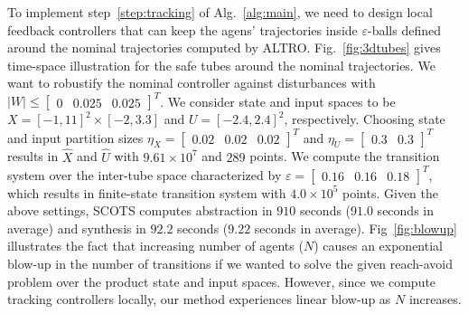  To implement step~\ref{step:tracking} of Alg.~\ref{alg:main}, we need to design local feedback controllers that can keep the agens' trajectories inside $\varepsilon$-balls defined around the nominal trajectories computed by ALTRO. Fig.~\ref{fig:3dtubes} gives time-space illustration for the safe tubes around the nominal trajectories. We want to robustify the nominal controller against disturbances with $|W|\leq \begin{bmatrix}0&0.025&0.025\end{bmatrix}^T$. We consider state and input spaces to be $X=[-1,11]^2\times[-2,3.3]$ and
$U=[-2.4,2.4]^2$, respectively. Choosing state and input partition sizes $\eta_{X}=\begin{bmatrix}0.02&0.02&0.02\end{bmatrix}^T$ and
$\eta_{U}=\begin{bmatrix}0.3&0.3\end{bmatrix}^T$ results in $\hat X$ and $\hat U$ with $9.61\times 10^7$ and $289$ points. We compute the transition system over the inter-tube space characterized by $\varepsilon=\begin{bmatrix}0.16&0.16&0.18\end{bmatrix}^T$, which results in finite-state transition system with $4.0\times 10^5$ points. Given the above settings, SCOTS computes abstraction in $910$ seconds ($91.0$ seconds in average) and synthesis in $92.2$ seconds ($9.22$ seconds in average). %
Fig~\ref{fig:blowup} illustrates the fact that increasing number of agents ($N$) causes an exponential blow-up in the number of transitions if we wanted to solve the given reach-avoid problem over the product state and input spaces. However, since we compute tracking controllers locally, our method experiences linear blow-up as $N$ increases.

